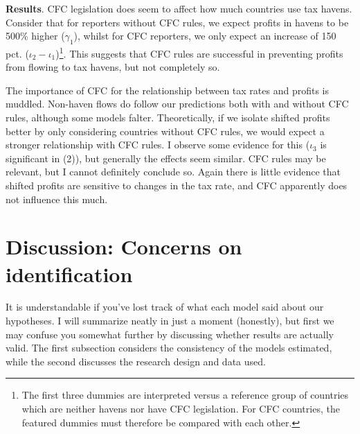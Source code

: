\documentclass[twoside,a4paper,11pt]{article}
\begin{document}
\begin{table}
{	
	}
\end{table}

\textbf{Results}. CFC legislation does seem to affect how much countries use tax havens. Consider that for reporters without CFC rules, we expect profits in havens to be 500\% higher ($ \gamma_1 $), whilst for CFC reporters, we only expect an increase of 150 pct. ($ \iota_2-\iota_1 $)\footnote{The first three dummies are interpreted versus a reference group of countries which are neither havens nor have CFC legislation. For CFC countries, the featured dummies must therefore be compared with each other.}. This suggests that CFC rules are successful in preventing profits from flowing to tax havens, but not completely so. 

The importance of CFC for the relationship between tax rates and profits is muddled. Non-haven flows do follow our predictions both with and without CFC rules, although some models falter. Theoretically, if we isolate shifted profits better by only considering countries without CFC rules, we would expect a stronger relationship with CFC rules. I observe some evidence for this ($ \iota_3 $ is significant in (2)), but generally the effects seem similar. CFC rules may be relevant, but I cannot definitely conclude so. 
Again there is little evidence that shifted profits are sensitive to changes in the tax rate, and  CFC apparently does not influence this much.  

\section{Discussion: Concerns on identification}\label{discussion}
It is understandable if you've lost track of what each model said about our hypotheses. I will summarize neatly in just a moment (honestly), but first we may confuse you somewhat further by discussing whether results are actually valid. The first subsection considers the consistency of the models estimated, while the second discusses the research design and data used. 
\end{document}
